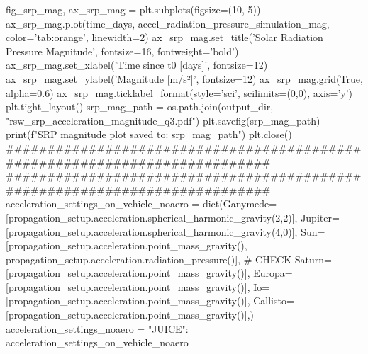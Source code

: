 \markdownRendererSectionEnd \markdownRendererSectionBegin
{}\markdownRendererInterblockSeparator
{}
\markdownRendererSectionEnd \markdownRendererSectionBegin
\markdownRendererHeadingOne{-------------------------------------------------------------------------}\markdownRendererInterblockSeparator
{}fig_srp_mag, ax_srp_mag = plt.subplots(figsize=(10, 5)) ax_srp_mag.plot(time_days, accel_radiation_pressure_simulation_mag, color='tab:orange', linewidth=2) ax_srp_mag.set_title('Solar Radiation Pressure Magnitude', fontsize=16, fontweight='bold') ax_srp_mag.set_xlabel('Time since t0 [days]', fontsize=12) ax_srp_mag.set_ylabel('Magnitude [m/s²]', fontsize=12) ax_srp_mag.grid(True, alpha=0.6) ax_srp_mag.ticklabel_format(style='sci', scilimits=(0,0), axis='y') plt.tight_layout() srp_mag_path = os.path.join(output_dir, "rsw_srp_acceleration_magnitude_q3.pdf") plt.savefig(srp_mag_path) print(f"SRP magnitude plot saved to: {srp_mag_path}") plt.close()\markdownRendererInterblockSeparator
{}###########################################################################\markdownRendererInterblockSeparator
{}
\markdownRendererSectionEnd \markdownRendererSectionBegin
{}\markdownRendererInterblockSeparator
{}###########################################################################\markdownRendererInterblockSeparator
{}
\markdownRendererSectionEnd \markdownRendererSectionBegin
{}\markdownRendererInterblockSeparator
{}acceleration_settings_on_vehicle_noaero = dict(Ganymede=[propagation_setup.acceleration.spherical_harmonic_gravity(2,2)],\markdownRendererInterblockSeparator
{}
\markdownRendererSectionEnd \markdownRendererSectionBegin
\markdownRendererHeadingOne{  propagation_setup.acceleration.aerodynamic()],}\markdownRendererInterblockSeparator
{}Jupiter=[propagation_setup.acceleration.spherical_harmonic_gravity(4,0)], Sun=[propagation_setup.acceleration.point_mass_gravity(), propagation_setup.acceleration.radiation_pressure()], # CHECK Saturn=[propagation_setup.acceleration.point_mass_gravity()], Europa=[propagation_setup.acceleration.point_mass_gravity()], Io=[propagation_setup.acceleration.point_mass_gravity()], Callisto=[propagation_setup.acceleration.point_mass_gravity()],)\markdownRendererInterblockSeparator
{}
\markdownRendererSectionEnd \markdownRendererSectionBegin
{}\markdownRendererInterblockSeparator
{}acceleration_settings_noaero = {"JUICE": acceleration_settings_on_vehicle_noaero}\markdownRendererInterblockSeparator
